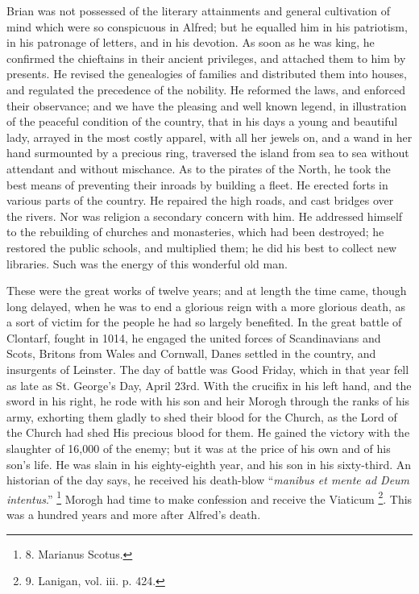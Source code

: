 Brian was not possessed of the
literary attainments and general cultivation of mind which were so
conspicuous in Alfred; but he equalled him in his patriotism, in his
patronage of letters, and in his devotion. As soon as he was king, he
confirmed the chieftains in their ancient privileges, and attached
them to him by presents. He revised the genealogies of families and
distributed them into houses, and regulated the precedence of the
nobility. He reformed the laws, and enforced their observance; and we
have the pleasing and well known legend, in illustration of the
peaceful condition of the country, that in his days a young and
beautiful lady, arrayed in the most costly apparel, with all her
jewels on, and a wand in her hand surmounted by a precious ring,
traversed the island from sea to sea without attendant and without
mischance. As to the pirates of the North, he took the best means of
preventing their inroads by building a fleet. He erected forts in
various parts of the country. He repaired the high roads, and
cast bridges over the rivers. Nor was religion a secondary concern
with him. He addressed himself to the rebuilding of churches and
monasteries, which had been destroyed; he restored the public schools,
and multiplied them; he did his best to collect new libraries. Such
was the energy of this wonderful old man.

These were the great works of
twelve years; and at length the time came, though long delayed, when
he was to end a glorious reign with a more glorious death, as a sort
of victim for the people he had so largely benefited. In the great
battle of Clontarf, fought in 1014, he engaged the united forces of
Scandinavians and Scots, Britons from Wales and Cornwall, Danes
settled in the country, and insurgents of Leinster. The day of battle
was Good Friday, which in that year fell as late as St. George's Day,
April 23rd. With the crucifix in his left hand, and the sword in his
right, he rode with his son and heir Morogh through the ranks of his
army, exhorting them gladly to shed their blood for the Church, as the
Lord of the Church had shed His precious blood for them. He gained the
victory with the slaughter of 16,000 of the enemy; but it was at the
price of his own and of his son's life. He was slain in his
eighty-eighth year, and his son in his sixty-third. An historian of
the day says, he received his death-blow ``\emph{manibus et mente ad Deum
intentus}.'' \footnote{8.
Marianus Scotus.} Morogh had
time to make confession and receive the Viaticum \footnote{9.
Lanigan, vol. iii. p. 424.}. This was a hundred years and more after Alfred's death.

